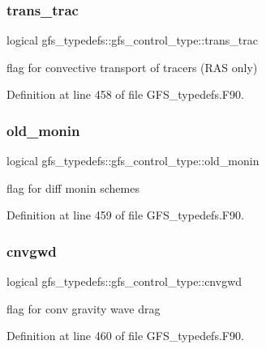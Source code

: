 \subsubsection{trans\+\_\+trac}
{\footnotesize\ttfamily logical gfs\+\_\+typedefs\+::gfs\+\_\+control\+\_\+type\+::trans\+\_\+trac}



flag for convective transport of tracers (R\+AS only) 



Definition at line 458 of file G\+F\+S\+\_\+typedefs.\+F90.

\mbox{\label{structgfs__typedefs_1_1gfs__control__type_a5b2a61e9db4f54ae341f4f06a5948c87}} 
\subsubsection{old\+\_\+monin}
{\footnotesize\ttfamily logical gfs\+\_\+typedefs\+::gfs\+\_\+control\+\_\+type\+::old\+\_\+monin}



flag for diff monin schemes 



Definition at line 459 of file G\+F\+S\+\_\+typedefs.\+F90.

\mbox{\label{structgfs__typedefs_1_1gfs__control__type_aff7fbb83eb1e16cde7d0ccf7662e0b1c}} 
\subsubsection{cnvgwd}
{\footnotesize\ttfamily logical gfs\+\_\+typedefs\+::gfs\+\_\+control\+\_\+type\+::cnvgwd}



flag for conv gravity wave drag 



Definition at line 460 of file G\+F\+S\+\_\+typedefs.\+F90.

\mbox{\label{structgfs__typedefs_1_1gfs__control__type_a62acee2129d497ebe7adb95aa75628b5}} 
